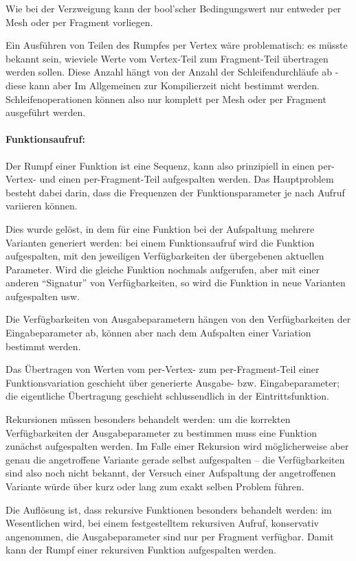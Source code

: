 \documentclass[twoside,a4paper,fleqn,12pt]{book}
\begin{document}
Wie bei der Verzweigung kann der bool'scher Bedingungswert nur entweder per Mesh oder per Fragment vorliegen.

Ein Ausführen von Teilen des Rumpfes per Vertex wäre problematisch: es müsste bekannt sein, wieviele Werte vom Vertex-Teil
zum Fragment-Teil übertragen werden sollen. Diese Anzahl hängt von der Anzahl der Schleifendurchläufe ab -
diese kann aber Im Allgemeinen zur Kompilierzeit nicht bestimmt werden. Schleifenoperationen können also nur komplett
per Mesh oder per Fragment ausgeführt werden.

\paragraph{Funktionsaufruf:} Der Rumpf einer Funktion ist eine Sequenz, kann also prinzipiell in einen per-Vertex- und einen per-Fragment-Teil aufgespalten werden.
Das Hauptproblem besteht dabei darin, dass die Frequenzen der Funktionsparameter je nach Aufruf variieren können.

Dies wurde gelöst, in dem für eine Funktion bei der Aufspaltung mehrere Varianten generiert werden: bei einem Funktionsaufruf
wird die Funktion aufgespalten, mit den jeweiligen Verfügbarkeiten der übergebenen aktuellen Parameter. Wird die gleiche Funktion
nochmals aufgerufen, aber mit einer anderen "`Signatur"' von Verfügbarkeiten, so wird die Funktion in neue Varianten aufgespalten usw.

Die Verfügbarkeiten von Ausgabeparametern hängen von den Verfügbarkeiten der Eingabeparameter ab, können aber nach dem Aufspalten
einer Variation bestimmt werden.

Das Übertragen von Werten vom per-Vertex- zum per-Fragment-Teil einer Funktionsvariation geschieht über generierte Ausgabe- bzw.
Eingabeparameter; die eigentliche Übertragung geschieht schlussendlich in der Eintrittsfunktion.

Rekursionen müssen besonders behandelt werden: um die korrekten Verfügbarkeiten der Ausgabeparameter zu bestimmen
muss eine Funktion zunächst aufgespalten werden. Im Falle einer Rekursion wird möglicherweise aber genau die angetroffene
Variante gerade selbst aufgespalten -- die Verfügbarkeiten sind also noch nicht bekannt, der Versuch einer Aufspaltung der
angetroffenen Variante würde über kurz oder lang zum exakt selben Problem führen.

Die Auflösung ist, dass rekursive Funktionen besonders behandelt werden: im Wesentlichen wird, bei einem festgestelltem
rekursiven Aufruf, konservativ angenommen, die Ausgabeparameter sind nur per Fragment verfügbar. Damit kann der Rumpf
einer rekursiven Funktion aufgespalten werden.
\end{document}
